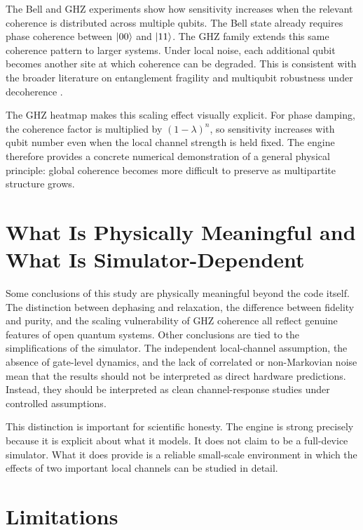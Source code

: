 The Bell and GHZ experiments show how sensitivity increases when the relevant coherence is distributed across multiple qubits. The Bell state already requires phase coherence between $\lvert 00 \rangle$ and $\lvert 11 \rangle$. The GHZ family extends this same coherence pattern to larger systems. Under local noise, each additional qubit becomes another site at which coherence can be degraded. This is consistent with the broader literature on entanglement fragility and multiqubit robustness under decoherence \cite{almeida2007entanglement,borras2009robustness}.

The GHZ heatmap makes this scaling effect visually explicit. For phase damping, the coherence factor is multiplied by $(1-\lambda)^n$, so sensitivity increases with qubit number even when the local channel strength is held fixed. The engine therefore provides a concrete numerical demonstration of a general physical principle: global coherence becomes more difficult to preserve as multipartite structure grows.

\section{What Is Physically Meaningful and What Is Simulator-Dependent}

Some conclusions of this study are physically meaningful beyond the code itself. The distinction between dephasing and relaxation, the difference between fidelity and purity, and the scaling vulnerability of GHZ coherence all reflect genuine features of open quantum systems. Other conclusions are tied to the simplifications of the simulator. The independent local-channel assumption, the absence of gate-level dynamics, and the lack of correlated or non-Markovian noise mean that the results should not be interpreted as direct hardware predictions. Instead, they should be interpreted as clean channel-response studies under controlled assumptions.

This distinction is important for scientific honesty. The engine is strong precisely because it is explicit about what it models. It does not claim to be a full-device simulator. What it does provide is a reliable small-scale environment in which the effects of two important local channels can be studied in detail.

\section{Limitations}

